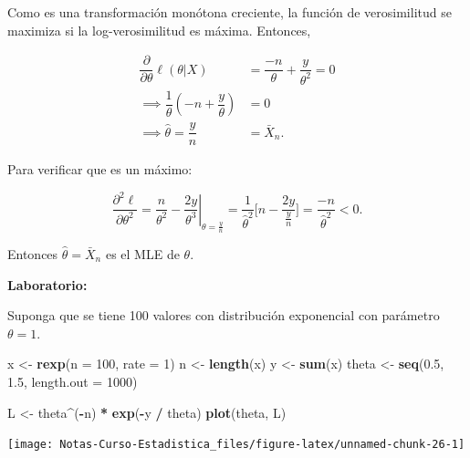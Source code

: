 \documentclass[
  12pt,
]{book}
\newenvironment{Shaded}{\begin{snugshade}}{\end{snugshade}}
\newcommand{\DataTypeTok}[1]{\textcolor[rgb]{0.13,0.29,0.53}{#1}}
\newcommand{\DecValTok}[1]{\textcolor[rgb]{0.00,0.00,0.81}{#1}}
\newcommand{\FloatTok}[1]{\textcolor[rgb]{0.00,0.00,0.81}{#1}}
\newcommand{\KeywordTok}[1]{\textcolor[rgb]{0.13,0.29,0.53}{\textbf{#1}}}
\newcommand{\NormalTok}[1]{#1}
\newcommand{\OperatorTok}[1]{\textcolor[rgb]{0.81,0.36,0.00}{\textbf{#1}}}
\newcommand{\StringTok}[1]{\textcolor[rgb]{0.31,0.60,0.02}{#1}}
\begin{document}
Como es una transformación monótona creciente, la función de verosimilitud se
maximiza si la log-verosimilitud es máxima. Entonces,

\begin{align*}
\dfrac{\partial}{\partial\theta} \ell(\theta|X) & = \dfrac{-n}{\theta}+\dfrac{y}{\theta^2} = 0 \\
\implies \dfrac{1}{\theta}\left(-n+\dfrac{y}\theta\right) & =0  \\
\implies \hat\theta = \dfrac{y}{n} & = \bar X_n.
\end{align*}

Para verificar que es un máximo:

\[\dfrac{\partial^2    \ell}{\partial\theta^2} = \left. \dfrac{n}{\theta^2} -\dfrac{2y}{\theta^3}\right\vert_{\theta = \frac{y}{n}} = \dfrac{1}{\hat\theta^2} \bigg[n-\dfrac{2y}{\frac yn}\bigg] = \dfrac{-n}{\hat\theta^2} < 0.\]

Entonces \(\hat\theta = \bar X_n\) es el MLE de \(\theta\).

\textbf{Laboratorio:}

Suponga que se tiene 100 valores con distribución exponencial con parámetro
\(\theta=1\).

\begin{Shaded}
\begin{Highlighting}[]
\NormalTok{x  \textless{}{-}}\StringTok{ }\KeywordTok{rexp}\NormalTok{(}\DataTypeTok{n =} \DecValTok{100}\NormalTok{, }\DataTypeTok{rate =} \DecValTok{1}\NormalTok{)}
\NormalTok{n \textless{}{-}}\StringTok{ }\KeywordTok{length}\NormalTok{(x)}
\NormalTok{y \textless{}{-}}\StringTok{ }\KeywordTok{sum}\NormalTok{(x)}
\NormalTok{theta \textless{}{-}}\StringTok{ }\KeywordTok{seq}\NormalTok{(}\FloatTok{0.5}\NormalTok{, }\FloatTok{1.5}\NormalTok{, }\DataTypeTok{length.out =} \DecValTok{1000}\NormalTok{)}
\end{Highlighting}
\end{Shaded}

\begin{Shaded}
\begin{Highlighting}[]
\NormalTok{L \textless{}{-}}\StringTok{ }\NormalTok{theta}\OperatorTok{\^{}}\NormalTok{(}\OperatorTok{{-}}\NormalTok{n) }\OperatorTok{*}\StringTok{ }\KeywordTok{exp}\NormalTok{(}\OperatorTok{{-}}\NormalTok{y }\OperatorTok{/}\StringTok{ }\NormalTok{theta)}
\KeywordTok{plot}\NormalTok{(theta, L)}
\end{Highlighting}
\end{Shaded}

\begin{center}\texttt{[image: Notas-Curso-Estadistica\_files/figure-latex/unnamed-chunk-26-1]} \end{center}
\end{document}
